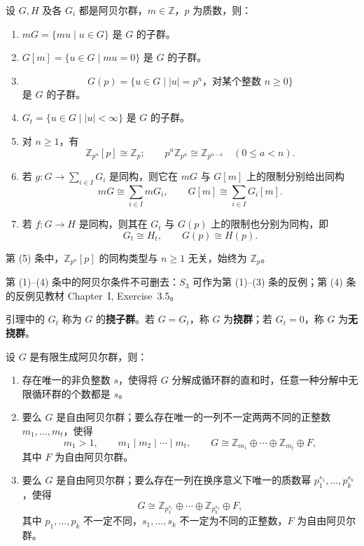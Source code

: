 \begin{lemma}\label{lem:abelian-characteristic-subgroups}
设 $G,H$ 及各 $G_i$ 都是阿贝尔群，$m\in\mathbb Z$，$p$ 为质数，则：
\begin{enumerate}[label=(\arabic*)]
  \item $mG=\{mu\mid u\in G\}$ 是 $G$ 的子群。
  \item $G[m]=\{u\in G\mid mu=0\}$ 是 $G$ 的子群。
  \item
  \[
    G(p)=\{u\in G\mid |u|=p^n\text{，对某个整数 }n\geq0\}
  \]
  是 $G$ 的子群。
  \item $G_t=\{u\in G\mid |u|<\infty\}$ 是 $G$ 的子群。
  \item 对 $n\geq1$，有
  \[
    \mathbb Z_{p^n}[p]\cong\mathbb Z_p;
    \qquad
    p^a\mathbb Z_{p^n}\cong\mathbb Z_{p^{n-a}}
    \quad(0\leq a<n).
  \]
  \item 若 $g:G\longrightarrow\sum_{i\in I}G_i$ 是同构，则它在 $mG$ 与 $G[m]$ 上的限制分别给出同构
  \[
    mG\cong\sum_{i\in I}mG_i,\qquad
    G[m]\cong\sum_{i\in I}G_i[m].
  \]
  \item 若 $f:G\longrightarrow H$ 是同构，则其在 $G_t$ 与 $G(p)$ 上的限制也分别为同构，即
  \[
    G_t\cong H_t,\qquad G(p)\cong H(p).
  \]
\end{enumerate}
\end{lemma}

\begin{purplenote}
第 (5) 条中，$\mathbb Z_{p^n}[p]$ 的同构类型与 $n\geq1$ 无关，始终为 $\mathbb Z_p$。

第 (1)--(4) 条中的阿贝尔条件不可删去：$S_3$ 可作为第 (1)--(3) 条的反例；第 (4) 条的反例见教材 Chapter~I, Exercise~3.5。

引理中的 $G_t$ 称为 $G$ 的\textbf{挠子群}。若 $G=G_t$，称 $G$ 为\textbf{挠群}；若 $G_t=0$，称 $G$ 为\textbf{无挠群}。
\end{purplenote}

\begin{theorem}\label{thm:fg-abelian-decomposition-uniqueness}
设 $G$ 是有限生成阿贝尔群，则：
\begin{enumerate}[label=(\arabic*)]
  \item 存在唯一的非负整数 $s$，使得将 $G$ 分解成循环群的直和时，任意一种分解中无限循环群的个数都是 $s$。
  \item 要么 $G$ 是自由阿贝尔群；要么存在唯一的一列不一定两两不同的正整数 $m_1,\ldots,m_t$，使得
  \[
    m_1>1,\qquad m_1\mid m_2\mid\cdots\mid m_t,
    \qquad
    G\cong\mathbb Z_{m_1}\oplus\cdots\oplus\mathbb Z_{m_t}\oplus F,
  \]
  其中 $F$ 为自由阿贝尔群。
  \item 要么 $G$ 是自由阿贝尔群；要么存在一列在换序意义下唯一的质数幂 $p_1^{s_1},\ldots,p_k^{s_k}$，使得
  \[
    G\cong
    \mathbb Z_{p_1^{s_1}}\oplus\cdots\oplus\mathbb Z_{p_k^{s_k}}\oplus F,
  \]
  其中 $p_1,\ldots,p_k$ 不一定不同，$s_1,\ldots,s_k$ 不一定为不同的正整数，$F$ 为自由阿贝尔群。
\end{enumerate}
\end{theorem}

